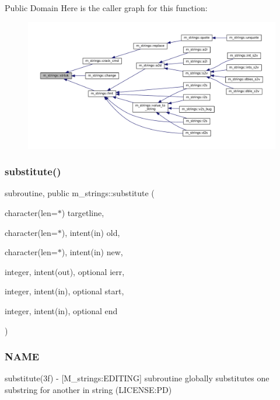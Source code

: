 Public Domain Here is the caller graph for this function\+:
\nopagebreak
\begin{figure}[H]
\begin{center}
\leavevmode
\includegraphics[width=350pt]{namespacem__strings_aa53af9135873e241c487a75a7073bda1_icgraph}
\end{center}
\end{figure}
\mbox{\label{namespacem__strings_ab84a4b7c2be211433c2d1b435a87fa32}} 
\subsubsection{\texorpdfstring{substitute()}{substitute()}}
{\footnotesize\ttfamily subroutine, public m\+\_\+strings\+::substitute (\begin{DoxyParamCaption}\item[{character(len=$\ast$)}]{targetline,  }\item[{character(len=$\ast$), intent(in)}]{old,  }\item[{character(len=$\ast$), intent(in)}]{new,  }\item[{integer, intent(out), optional}]{ierr,  }\item[{integer, intent(in), optional}]{start,  }\item[{integer, intent(in), optional}]{end }\end{DoxyParamCaption})}



\subsubsection*{N\+A\+ME}

substitute(3f) -\/ \mbox{[}M\+\_\+strings\+:E\+D\+I\+T\+I\+NG\mbox{]} subroutine globally substitutes one substring for another in string (L\+I\+C\+E\+N\+SE\+:PD) 

